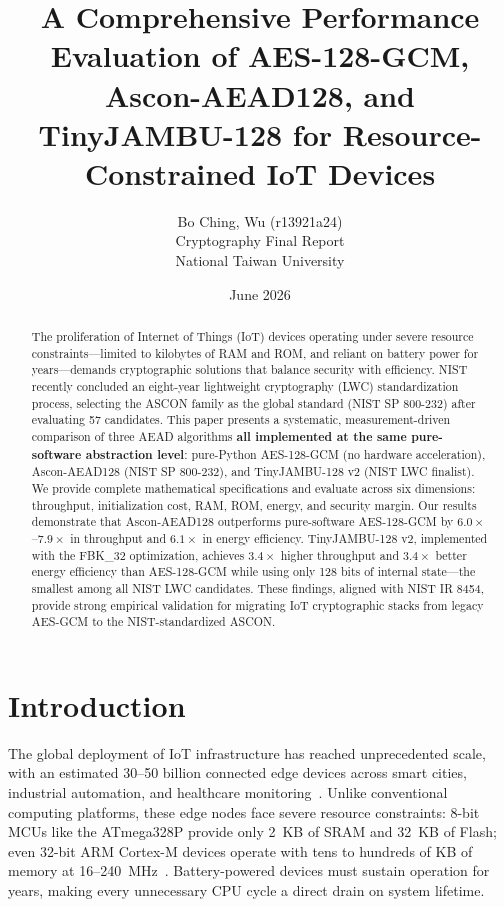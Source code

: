 \documentclass[11pt,a4paper]{article}
\title{\Large\textbf{A Comprehensive Performance Evaluation of AES-128-GCM, Ascon-AEAD128, and TinyJAMBU-128 for Resource-Constrained IoT Devices}}\\
\author{Bo Ching, Wu (r13921a24)\\  Cryptography Final Report\\ National Taiwan University}
\date{June 2026}
\begin{document}
\maketitle

\begin{abstract}
The proliferation of Internet of Things (IoT) devices operating under severe resource constraints---limited to kilobytes of RAM and ROM, and reliant on battery power for years---demands cryptographic solutions that balance security with efficiency. NIST recently concluded an eight-year lightweight cryptography (LWC) standardization process, selecting the ASCON family as the global standard (NIST SP 800-232) after evaluating 57 candidates. This paper presents a systematic, measurement-driven comparison of three AEAD algorithms \textbf{all implemented at the same pure-software abstraction level}: pure-Python AES-128-GCM (no hardware acceleration), Ascon-AEAD128 (NIST SP 800-232), and TinyJAMBU-128 v2 (NIST LWC finalist). We provide complete mathematical specifications and evaluate across six dimensions: throughput, initialization cost, RAM, ROM, energy, and security margin. Our results demonstrate that Ascon-AEAD128 outperforms pure-software AES-128-GCM by $6.0\times$--$7.9\times$ in throughput and $6.1\times$ in energy efficiency. TinyJAMBU-128 v2, implemented with the FBK\_32 optimization, achieves $3.4\times$ higher throughput and $3.4\times$ better energy efficiency than AES-128-GCM while using only 128 bits of internal state---the smallest among all NIST LWC candidates. These findings, aligned with NIST IR 8454, provide strong empirical validation for migrating IoT cryptographic stacks from legacy AES-GCM to the NIST-standardized ASCON.
\end{abstract}

\section{Introduction}

The global deployment of IoT infrastructure has reached unprecedented scale, with an estimated 30--50 billion connected edge devices across smart cities, industrial automation, and healthcare monitoring~\cite{nistir8454}. Unlike conventional computing platforms, these edge nodes face severe resource constraints: 8-bit MCUs like the ATmega328P provide only 2~KB of SRAM and 32~KB of Flash; even 32-bit ARM Cortex-M devices operate with tens to hundreds of KB of memory at 16--240~MHz~\cite{nistir8454,renner2022}. Battery-powered devices must sustain operation for years, making every unnecessary CPU cycle a direct drain on system lifetime.
\end{document}
